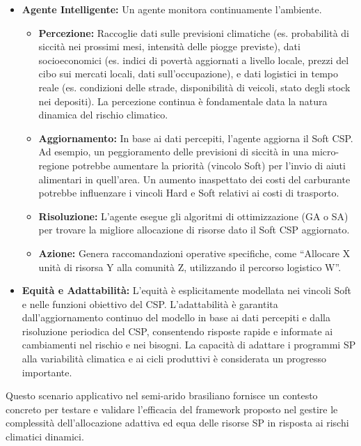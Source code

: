 \documentclass[letterpaper]{article}
\begin{document}
\begin{itemize}
    \item \textbf{Agente Intelligente:} Un agente monitora continuamente l'ambiente.
          \begin{itemize}
              \item \textbf{Percezione:} Raccoglie dati sulle previsioni climatiche (es. probabilità di siccità nei prossimi mesi, intensità delle piogge previste), dati socioeconomici (es. indici di povertà aggiornati a livello locale, prezzi del cibo sui mercati locali, dati sull'occupazione), e dati logistici in tempo reale (es. condizioni delle strade, disponibilità di veicoli, stato degli stock nei depositi). La percezione continua è fondamentale data la natura dinamica del rischio climatico.
              \item \textbf{Aggiornamento:} In base ai dati percepiti, l'agente aggiorna il Soft CSP. Ad esempio, un peggioramento delle previsioni di siccità in una micro-regione potrebbe aumentare la priorità (vincolo Soft) per l'invio di aiuti alimentari in quell'area. Un aumento inaspettato dei costi del carburante potrebbe influenzare i vincoli Hard e Soft relativi ai costi di trasporto.
              \item \textbf{Risoluzione:} L'agente esegue gli algoritmi di ottimizzazione (GA o SA) per trovare la migliore allocazione di risorse dato il Soft CSP aggiornato.
              \item \textbf{Azione:} Genera raccomandazioni operative specifiche, come ``Allocare X unità di risorsa Y alla comunità Z, utilizzando il percorso logistico W''.
          \end{itemize}

    \item \textbf{Equità e Adattabilità:} L'equità è esplicitamente modellata nei vincoli Soft e nelle funzioni obiettivo del CSP. L'adattabilità è garantita dall'aggiornamento continuo del modello in base ai dati percepiti e dalla risoluzione periodica del CSP, consentendo risposte rapide e informate ai cambiamenti nel rischio e nei bisogni. La capacità di adattare i programmi SP alla variabilità climatica e ai cicli produttivi è considerata un progresso importante.
\end{itemize}

Questo scenario applicativo nel semi-arido brasiliano fornisce un contesto concreto per testare e validare l'efficacia del framework proposto nel gestire le complessità dell'allocazione adattiva ed equa delle risorse SP in risposta ai rischi climatici dinamici.
\end{document}
